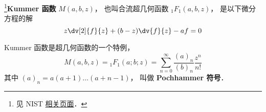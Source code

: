 
\begin{issues}
\issueDraft
\end{issues}

\footnote{见 NIST \href{https://dlmf.nist.gov/13.2#E2}{相关页面}．}\textbf{Kummer 函数} $M(a, b, z)$， 也叫合流超几何函数 $_1F_1(a, b, z)$， 是以下微分方程的解
\begin{equation}
z\dv[2]{f}{z} + (b-z)\dv{f}{z} - a f = 0
\end{equation}

Kummer 函数是超几何函数的一个特例， 
\begin{equation}
M(a, b, z) = {_1F_1}(a; b; z) = \sum_{n=0}^\infty \frac{(a)_n}{(b)_n} \frac{z^n}{n!}
\end{equation}
其中 $(a)_n = a(a+1)\dots(a+n-1)$， 叫做 \textbf{Pochhammer 符号}．


